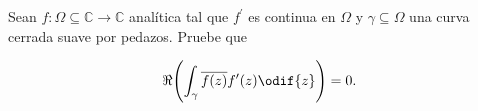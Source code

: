 \documentclass[../main.tex]{subfiles}
\begin{document}
\begin{problema}
    Sean \(f \colon \Omega \subseteq \mathbb{C} \to \mathbb{C}\) analítica tal que
    \(f^{\prime}\) es continua en \(\Omega\) y \(\gamma \subseteq \Omega\) una curva
    cerrada suave por pedazos. Pruebe que

    \begin{equation}
        \Re \Biggl(\int_{\gamma}^{}\overline{f(z)}f^{\prime}(z)\odif{z}\Biggr) = 0.
    \end{equation}
\end{problema}
\end{document}
